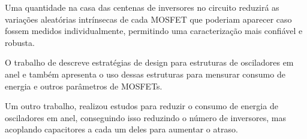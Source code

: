 Uma quantidade na casa das centenas de inversores no circuito reduzirá as variações aleatórias intrínsecas de cada MOSFET que poderiam aparecer caso fossem medidos individualmente, permitindo uma caracterização mais confiável e robusta.

O trabalho de \cite{Bhushan} descreve estratégias de design para estruturas de osciladores em anel e também apresenta o uso dessas estruturas para mensurar consumo de energia e outros parâmetros de MOSFETs.

Um outro trabalho, \cite{Michal} realizou estudos para reduzir o consumo de energia de osciladores em anel, conseguindo isso reduzindo o número de inversores, mas acoplando capacitores a cada um deles para aumentar o atraso.
